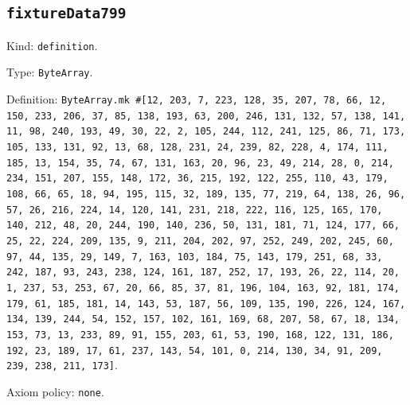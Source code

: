 \documentclass[11pt]{article}
\begin{document}
\subsection*{\texttt{fixtureData799}}
\noindent Kind: \texttt{definition}.\par
\noindent Type: \texttt{ByteArray}.\par
\noindent Definition: \texttt{ByteArray.mk \#[12, 203, 7, 223, 128, 35, 207, 78, 66, 12, 150, 233, 206, 37, 85, 138, 193, 63, 200, 246, 131, 132, 57, 138, 141, 11, 98, 240, 193, 49, 30, 22, 2, 105, 244, 112, 241, 125, 86, 71, 173, 105, 133, 131, 92, 13, 68, 128, 231, 24, 239, 82, 228, 4, 174, 111, 185, 13, 154, 35, 74, 67, 131, 163, 20, 96, 23, 49, 214, 28, 0, 214, 234, 151, 207, 155, 148, 172, 36, 215, 192, 122, 255, 110, 43, 179, 108, 66, 65, 18, 94, 195, 115, 32, 189, 135, 77, 219, 64, 138, 26, 96, 57, 26, 216, 224, 14, 120, 141, 231, 218, 222, 116, 125, 165, 170, 140, 212, 48, 20, 244, 190, 140, 236, 50, 131, 181, 71, 124, 177, 66, 25, 22, 224, 209, 135, 9, 211, 204, 202, 97, 252, 249, 202, 245, 60, 97, 44, 135, 29, 149, 7, 163, 103, 184, 75, 143, 179, 251, 68, 33, 242, 187, 93, 243, 238, 124, 161, 187, 252, 17, 193, 26, 22, 114, 20, 1, 237, 53, 253, 67, 20, 66, 85, 37, 81, 196, 104, 163, 92, 181, 174, 179, 61, 185, 181, 14, 143, 53, 187, 56, 109, 135, 190, 226, 124, 167, 134, 139, 244, 54, 152, 157, 102, 161, 169, 68, 207, 58, 67, 18, 134, 153, 73, 13, 233, 89, 91, 155, 203, 61, 53, 190, 168, 122, 131, 186, 192, 23, 189, 17, 61, 237, 143, 54, 101, 0, 214, 130, 34, 91, 209, 239, 238, 211, 173]}.\par
\noindent Axiom policy: \texttt{none}.\par
\end{document}
